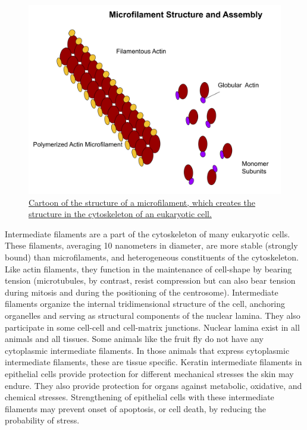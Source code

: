 \begin{figure}

{\centering \includegraphics[width=0.7\linewidth]{./figures/cells/Microfilament_Structure} 

}

\caption{\href{https://commons.wikimedia.org/wiki/File:Microfilament_Structure.svg}{Cartoon of the structure of a microfilament, which creates the structure in the cytoskeleton of an eukaryotic cell.}}\label{fig:microfilament}
\end{figure}

Intermediate filaments are a part of the cytoskeleton of many eukaryotic cells. These filaments, averaging 10 nanometers in diameter, are more stable (strongly bound) than microfilaments, and heterogeneous constituents of the cytoskeleton. Like actin filaments, they function in the maintenance of cell-shape by bearing tension (microtubules, by contrast, resist compression but can also bear tension during mitosis and during the positioning of the centrosome). Intermediate filaments organize the internal tridimensional structure of the cell, anchoring organelles and serving as structural components of the nuclear lamina. They also participate in some cell-cell and cell-matrix junctions. Nuclear lamina exist in all animals and all tissues. Some animals like the fruit fly do not have any cytoplasmic intermediate filaments. In those animals that express cytoplasmic intermediate filaments, these are tissue specific. Keratin intermediate filaments in epithelial cells provide protection for different mechanical stresses the skin may endure. They also provide protection for organs against metabolic, oxidative, and chemical stresses. Strengthening of epithelial cells with these intermediate filaments may prevent onset of apoptosis, or cell death, by reducing the probability of stress.



